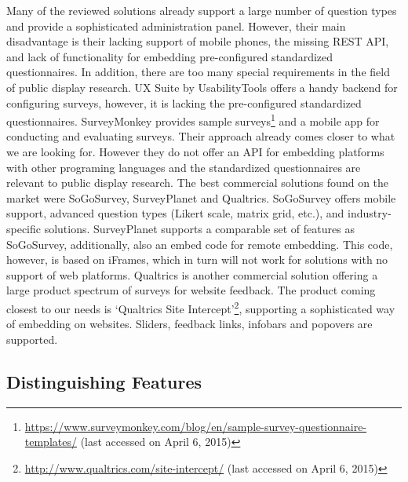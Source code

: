 	Many of the reviewed solutions already support a large number of question types and provide a sophisticated administration panel. However, their main disadvantage is their lacking support of mobile phones, the missing REST API, and lack of functionality for embedding pre-configured standardized questionnaires. In addition, there are too many special requirements in the field of public display research. 
	UX Suite by UsabilityTools offers a handy backend for configuring surveys, however, it is lacking the pre-configured standardized questionnaires. 
	SurveyMonkey provides sample surveys\footnote{\url{https://www.surveymonkey.com/blog/en/sample-survey-questionnaire-templates/} (last accessed on April 6, 2015)} and a mobile app for conducting and evaluating surveys. Their approach already comes closer to what we are looking for. However they do not offer an API for embedding platforms with other programing languages and the standardized questionnaires are relevant to public display research.
	The best commercial solutions found on the market were SoGoSurvey, SurveyPlanet and Qualtrics. 
		SoGoSurvey offers mobile support, advanced question types (Likert scale, matrix grid, etc.), and industry-specific solutions.
		SurveyPlanet supports a comparable set of features as SoGoSurvey, additionally, also an embed code for remote embedding. This code, however, is based on iFrames, which in turn will not work for solutions with no support of web platforms.
		Qualtrics is another commercial solution offering a large product spectrum of surveys for website feedback. The product coming closest to our needs is `Qualtrics Site Intercept'\footnote{\url{http://www.qualtrics.com/site-intercept/} (last accessed on April 6, 2015)}, supporting a sophisticated way of embedding on websites. Sliders, feedback links, infobars and popovers are supported.



	\subsection{Distinguishing Features}

